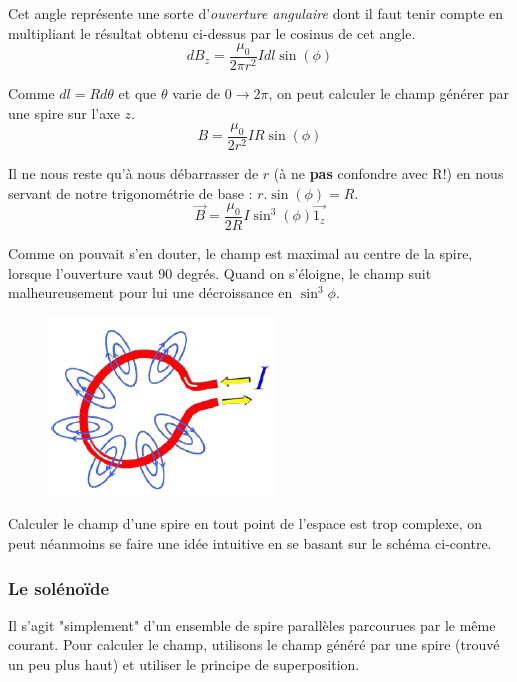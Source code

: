 \documentclass	[11pt, a4paper, openany]{book}
\begin{document}
Cet angle représente une sorte d'\textit{ouverture angulaire} dont il faut tenir compte en multipliant le résultat obtenu ci-dessus par le cosinus de cet angle.
\begin{equation}
dB_z = \frac{\mu_0}{2\pi r^2}Idl\sin (\phi)
\end{equation}

Comme $dl = Rd\theta$ et que $\theta$ varie de $0 \rightarrow 2\pi$, on peut calculer le champ générer par une spire sur l'axe $z$.
\begin{equation}
B = \frac{\mu_0}{2 r^2} IR \sin (\phi)
\end{equation}

Il ne nous reste qu'à nous débarrasser de $r$ (à ne \textbf{pas} confondre avec R!) en nous servant de notre trigonométrie de base : $r.\sin (\phi) = R$.
\begin{equation}
\vec{B} = \frac{\mu_0}{2R}I \sin^3(\phi)\vec{1_z}
\end{equation}


Comme on pouvait s'en douter, le champ est maximal au centre de la spire, lorsque l'ouverture vaut 90 degrés. Quand on s'éloigne, le champ suit malheureusement pour lui une décroissance en $\sin^3\phi$.\\

\begin{figure}
\includegraphics[scale=0.50]{magneto/image10.png}
\end{figure}

Calculer le champ d'une spire en tout point de l'espace est trop complexe, on peut néanmoins se faire une idée intuitive en se basant sur le schéma ci-contre.


\subsubsection{Le solénoïde}
Il s'agit "simplement" d'un ensemble de spire parallèles parcourues par le même courant. Pour calculer le champ, utilisons le champ généré par une spire (trouvé un peu plus haut) et utiliser le principe de superposition.\\
\end{document}
